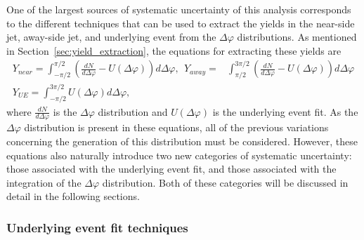 One of the largest sources of systematic uncertainty of this analysis corresponds to the different techniques that can be used to extract the yields in the near-side jet, away-side jet, and underlying event from the $\Delta\varphi$ distributions. As mentioned in Section~\ref{sec:yield_extraction}, the equations for extracting these yields are
%
\begin{eqnarray}
    Y_{near} = \int_{-\pi/2}^{\pi/2} (\frac{dN}{d\Delta\varphi}- U(\Delta\varphi))d\Delta\varphi,  \  \ Y_{away} = & \int_{\pi/2}^{3\pi/2} (\frac{dN}{d\Delta\varphi}- U(\Delta\varphi))d\Delta\varphi 
    \label{eq:jet_yields_ref}
    \\ 
    Y_{UE} = \int_{-\pi/2}^{3\pi/2} U(\Delta\varphi)d\Delta\varphi,
    \label{eq:ue_yield_ref}
\end{eqnarray}
%
where $\frac{dN}{d\Delta\varphi}$ is the $\Delta\varphi$ distribution and $U(\Delta\varphi)$ is the underlying event fit. As the $\Delta\varphi$ distribution is present in these equations, all of the previous variations concerning the generation of this distribution must be considered. However, these equations also naturally introduce two new categories of systematic uncertainty: those associated with the underlying event fit, and those associated with the integration of the $\Delta\varphi$ distribution. Both of these categories will be discussed in detail in the following sections.


\subsubsection{Underlying event fit techniques}
\label{sec:ue_fit_systematics}

